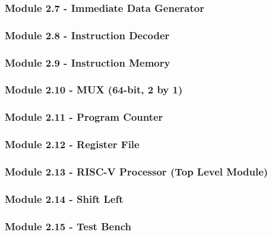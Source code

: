 \documentclass[12pt]{article}
\begin{document}
\subsubsection*{\large Module 2.7 - Immediate Data Generator}

\subsubsection*{\large Module 2.8 - Instruction Decoder}

\subsubsection*{\large Module 2.9 - Instruction Memory}

\subsubsection*{\large Module 2.10 - MUX (64-bit, 2 by 1)}

\subsubsection*{\large Module 2.11 - Program Counter}

\subsubsection*{\large Module 2.12 - Register File}

\subsubsection*{\large Module 2.13 - RISC-V Processor (Top Level Module)}

\subsubsection*{\large Module 2.14 - Shift Left}

\subsubsection*{\large Module 2.15 - Test Bench}

\end{document}
